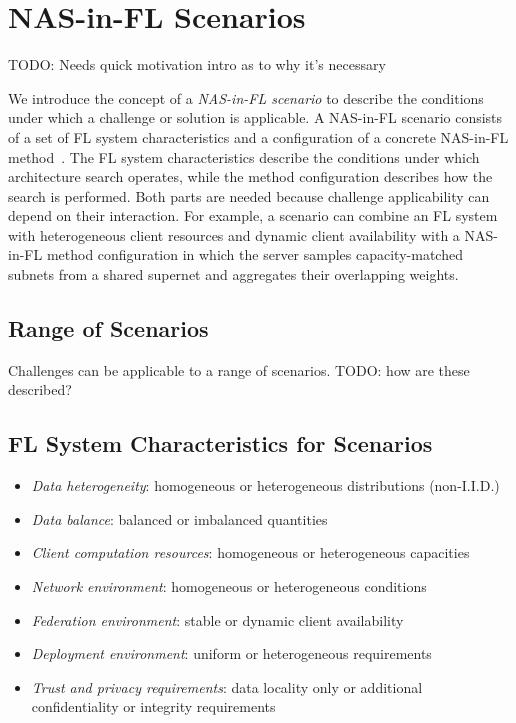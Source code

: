 \chapter{NAS-in-FL Scenarios}\label{chapter:nas_in_fl_scenarios}

TODO: Needs quick motivation intro as to why it's necessary

We introduce the concept of a \textit{NAS-in-FL scenario} to describe the conditions under which a challenge or solution is applicable. A NAS-in-FL scenario consists of a set of FL system characteristics and a configuration of a concrete NAS-in-FL method~\cite{nas_in_fl_2026}. The FL system characteristics describe the conditions under which architecture search operates, while the method configuration describes how the search is performed. Both parts are needed because challenge applicability can depend on their interaction. For example, a scenario can combine an FL system with heterogeneous client resources and dynamic client availability with a NAS-in-FL method configuration in which the server samples capacity-matched subnets from a shared supernet and aggregates their overlapping weights.

\section{Range of Scenarios}

Challenges can be applicable to a range of scenarios. TODO: how are these described?


\section{FL System Characteristics for Scenarios}

\begin{itemize}
    \item \textit{Data heterogeneity}: homogeneous or heterogeneous distributions (non-I.I.D.)
    \item \textit{Data balance}: balanced or imbalanced quantities
    \item \textit{Client computation resources}: homogeneous or heterogeneous capacities
    \item \textit{Network environment}: homogeneous or heterogeneous conditions
    \item \textit{Federation environment}: stable or dynamic client availability
    \item \textit{Deployment environment}: uniform or heterogeneous requirements
    \item \textit{Trust and privacy requirements}: data locality only or additional confidentiality or integrity requirements
\end{itemize}
